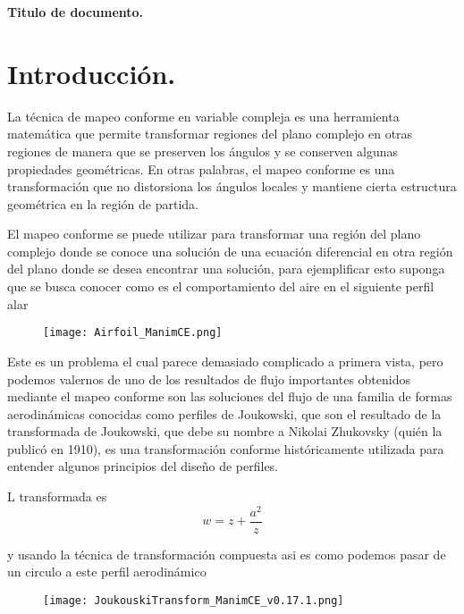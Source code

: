\documentclass[12pt]{article}
\begin{document}
\newpage
\begin{center}
    \textbf{\Large Titulo de documento.}
    \end{center}

\section*{Introducción.}
	\noindent La técnica de mapeo conforme en variable compleja es una herramienta matemática que permite transformar regiones del plano complejo en otras regiones de manera que se preserven los ángulos y se conserven algunas propiedades geométricas. En otras palabras, el mapeo conforme es una transformación que no distorsiona los ángulos locales y mantiene cierta estructura geométrica en la región de partida.

	El mapeo conforme se puede utilizar para transformar una región del plano complejo donde se conoce una solución de una ecuación diferencial en otra región del plano donde se desea encontrar una solución, para ejemplificar esto suponga que se busca conocer como es el comportamiento del aire en el siguiente perfil alar

	\begin{figure}[!h]
		\begin{small}
			\begin{center}
				\texttt{[image: Airfoil\_ManimCE.png]}
			\end{center}
			\caption{}
			\label{fig:}
		\end{small}
	\end{figure}
	
	\noindent Este es un problema el cual parece demasiado complicado a primera vista, pero podemos valernos de uno de los resultados de flujo importantes obtenidos mediante el mapeo conforme son las soluciones del flujo de una familia de formas aerodinámicas conocidas como perfiles de Joukowski, que son el resultado de  la transformada de Joukowski, que debe su nombre a Nikolai Zhukovsky (quién la publicó en 1910), es una transformación conforme históricamente utilizada para entender algunos principios del diseño de perfiles.
	
	L transformada es
	\begin{equation}
		w = z + \frac{a^2}{z}
		\label{eq:}
	\end{equation}
	
	y usando la técnica de transformación compuesta asi es como podemos pasar de un circulo a este perfil aerodinámico
	\begin{figure}[!h]
		\begin{small}
			\begin{center}
				\texttt{[image: JoukouskiTransform\_ManimCE\_v0.17.1.png]}
			\end{center}
			\caption{}
			\label{fig:1}
		\end{small}
	\end{figure}
	
\end{document}

